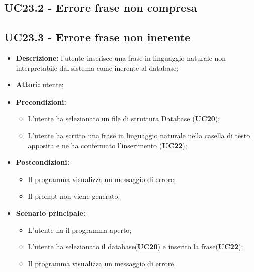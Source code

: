 \documentclass[5pt]{article}
\begin{document}
\subsection{UC23.2 - Errore frase non compresa}
\label{sec:UC23.2}

\subsection{UC23.3 - Errore frase non inerente}
\label{sec:UC23.3}
\begin{itemize}
	\item \textbf{Descrizione:} l’utente inserisce una frase in linguaggio naturale non interpretabile dal sistema come inerente al database;
	\item \textbf{Attori:} utente;
	\item \textbf{Precondizioni:} 
	\begin{itemize}
		\item L’utente ha selezionato un file di struttura Database (\hyperref[sec:UC20]{\textbf{UC20}});
		\item L’utente ha scritto una frase in linguaggio naturale nella casella di testo apposita e ne ha confermato l’inserimento (\hyperref[sec:UC22]{\textbf{UC22}});
	\end{itemize}
	\item \textbf{Postcondizioni:} 
	\begin{itemize}
		\item Il programma visualizza un messaggio di errore;
		\item Il prompt non viene generato;
	\end{itemize}
	\item \textbf{Scenario principale:} 
	\begin{itemize}
		\item L’utente ha il programma aperto;
		\item L’utente ha selezionato il database(\hyperref[sec:UC20]{\textbf{UC20}}) e inserito la frase(\hyperref[sec:UC22]{\textbf{UC22}});
		\item Il programma visualizza un messaggio di errore.
	\end{itemize}
\end{itemize}
\end{document}
